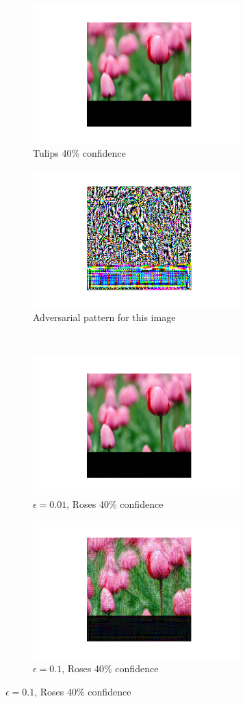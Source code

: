 \begin{figure}[h]
    \begin{subfigure}{0.4\textwidth}
        \caption{Tulips 40\% confidence}
        \includegraphics[width=8cm]{images/og_image}
    \end{subfigure}
    \begin{subfigure}{0.4\textwidth}
        \caption{Adversarial pattern for this image}
        \includegraphics[width=8cm]{images/adv_pattern}
    \end{subfigure}
    \\
    \begin{subfigure}{0.4\textwidth}
        \caption{$\epsilon = 0.01$, Roses 40\% confidence}
        \includegraphics[width=8cm]{images/adv_attack_001}
    \end{subfigure}
    \begin{subfigure}{0.4\textwidth}
        \caption{$\epsilon = 0.1$, Roses 40\% confidence}
        \includegraphics[width=8cm]{images/adv_attack_01}
    \end{subfigure}


\end{figure}
